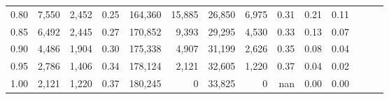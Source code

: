 \begin{tabular}{rrrrrrrrrrrrrr}
0.80 &   7,550 &  2,452 &  0.25 &  164,360 &   15,885 &  26,850 &   6,975 &  0.31 &  0.21 &      0.11 \\
0.85 &   6,492 &  2,445 &  0.27 &  170,852 &    9,393 &  29,295 &   4,530 &  0.33 &  0.13 &      0.07 \\
0.90 &   4,486 &  1,904 &  0.30 &  175,338 &    4,907 &  31,199 &   2,626 &  0.35 &  0.08 &      0.04 \\
0.95 &   2,786 &  1,406 &  0.34 &  178,124 &    2,121 &  32,605 &   1,220 &  0.37 &  0.04 &      0.02 \\
1.00 &   2,121 &  1,220 &  0.37 &  180,245 &        0 &  33,825 &       0 &   nan &  0.00 &      0.00 \\
\bottomrule
\end{tabular}
